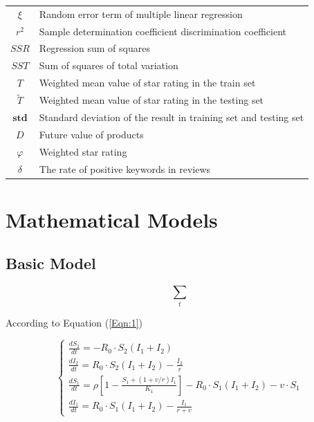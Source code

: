 \documentclass[11pt,a4]{article}
\begin{document}
\begin{table}[h]
\begin{center}
{\begin{tabular}{c l}
$\xi$ & {Random error term of multiple linear regression} \\
$r^2$ & {Sample determination coefficient discrimination coefficient} \\
$SSR$ & {Regression sum of squares} \\
$SST$ & {Sum of squares of total variation} \\
$T$   & {Weighted mean value of star rating in the train set}\\
$\widetilde{T}$  & {Weighted mean value of star rating in the testing set}\\
$\textbf{std}$  &  {Standard deviation of the result in training set and testing set}\\
$D$ & {Future value of products} \\
$\varphi$ & {Weighted star rating} \\
$\delta$ & {The rate of positive keywords in reviews} \\
\bottomrule
\end{tabular}}
\end{center}
\end{table}



\section{Mathematical Models}
\label{MathModels}


\subsection{Basic Model}

\begin{equation}
\sum\limits_t
\label{Eqn:1}
\end{equation}

According to Equation (\ref{Eqn:1})

\begin{equation}
\left\{ {\begin{array}{*{20}{l}}
{\frac{{d{S_2}}}{{dt}} =  - {R_0} \cdot {S_2}({I_1} + {I_2})}\\
{\frac{{d{I_2}}}{{dt}} = {R_0} \cdot {S_2}({I_1} + {I_2}) - \frac{{{I_2}}}{r}}\\
{\frac{{d{S_1}}}{{dt}} = \rho \left[ {1 - \frac{{{S_1} + (1 + v/r){I_1}}}{{{K_1}}}} \right] - {R_0} \cdot {S_1}({I_1} + {I_2}) - v \cdot {S_1}}\\
{\frac{{d{I_1}}}{{dt}} = {R_0} \cdot {S_1}({I_1} + {I_2}) - \frac{{{I_1}}}{{r + v}}}
\end{array}} \right.
\end{equation}
\end{document}
